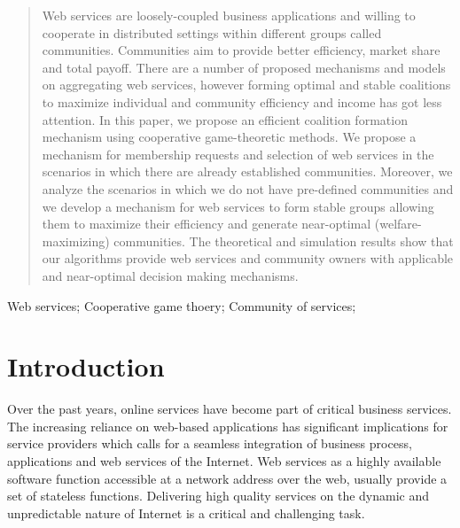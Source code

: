 \documentclass[10pt, conference, compsocconf]{IEEEtran}
\theoremstyle{plain}
\theoremstyle{definition}
\begin{document}
\maketitle


\begin{abstract}

Web services are loosely-coupled business applications and willing to cooperate in distributed settings within different groups called communities. Communities aim to provide better efficiency, market share and total payoff. There are a number of proposed mechanisms and models on aggregating web services, however forming optimal and stable coalitions to maximize individual and community efficiency and income has got less attention. In this paper, we propose an efficient coalition formation mechanism using cooperative game-theoretic methods. We propose a mechanism for membership requests and selection of web services in the scenarios in which there are already established communities. Moreover, we analyze the scenarios in which we do not have pre-defined communities and we develop a mechanism for web services to form stable groups allowing them to maximize their efficiency and generate near-optimal (welfare-maximizing) communities. The theoretical and simulation results show that our algorithms provide web services and community owners with applicable and near-optimal decision making mechanisms.

\end{abstract}

\begin{IEEEkeywords}
Web services; Cooperative game thoery; Community of services;

\end{IEEEkeywords}


%
\IEEEpeerreviewmaketitle

\section{Introduction}

Over the past years, online services have become part of critical business services. The increasing reliance on web-based applications has significant implications for service providers which calls for a seamless integration of business process, applications and web services of the Internet. Web services as a highly available software function accessible at a network address over the web, usually provide a set of stateless functions. Delivering high quality services on the dynamic and unpredictable nature of Internet is a critical and challenging task.
\end{document}
